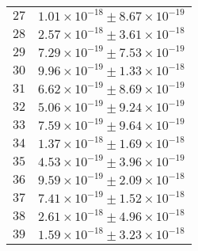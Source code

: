 \begin{tabular}{| p{} | p{} |}
$27$ & $1.01\times 10^{-18} \pm 8.67\times10^{-19}$\\
$28$ & $2.57\times 10^{-18} \pm 3.61\times10^{-18}$\\
$29$ & $7.29\times 10^{-19} \pm 7.53\times10^{-19}$\\
$30$ & $9.96\times 10^{-19} \pm 1.33\times10^{-18}$\\
$31$ & $6.62\times 10^{-19} \pm 8.69\times10^{-19}$\\
$32$ & $5.06\times 10^{-19} \pm 9.24\times10^{-19}$\\
$33$ & $7.59\times 10^{-19} \pm 9.64\times10^{-19}$\\
$34$ & $1.37\times 10^{-18} \pm 1.69\times10^{-18}$\\
$35$ & $4.53\times 10^{-19} \pm 3.96\times10^{-19}$\\
$36$ & $9.59\times 10^{-19} \pm 2.09\times10^{-18}$\\
$37$ & $7.41\times 10^{-19} \pm 1.52\times10^{-18}$\\
$38$ & $2.61\times 10^{-18} \pm 4.96\times10^{-18}$\\
$39$ & $1.59\times 10^{-18} \pm 3.23\times10^{-18}$\\
\hline
\end{tabular}
